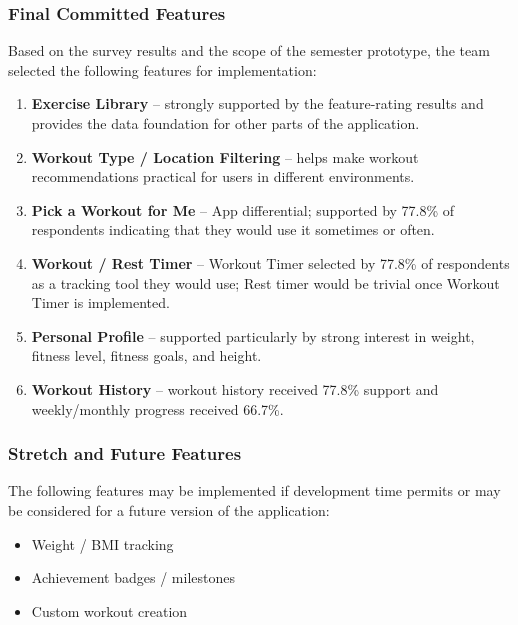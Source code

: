 \documentclass[11pt]{article}
\begin{document}

\subsubsection{Final Committed Features}

Based on the survey results and the scope of the semester prototype, the team selected the following features for implementation:

\begin{enumerate}
    \item \textbf{Exercise Library} -- strongly supported by the feature-rating results and provides the data foundation for other parts of the application.
    \item \textbf{Workout Type / Location Filtering} -- helps make workout recommendations practical for users in different environments.
    \item \textbf{Pick a Workout for Me} -- App differential; supported by 77.8\% of respondents indicating that they would use it sometimes or often.
    \item \textbf{Workout / Rest Timer} -- Workout Timer selected by 77.8\% of respondents as a tracking tool they would use; Rest timer would be trivial once Workout Timer is implemented.
    \item \textbf{Personal Profile} -- supported particularly by strong interest in weight, fitness level, fitness goals, and height.
    \item \textbf{Workout History} -- workout history received 77.8\% support and weekly/monthly progress received 66.7\%.
\end{enumerate}

\subsubsection{Stretch and Future Features}

The following features may be implemented if development time permits
or may be considered for a future version of the application:

\begin{itemize}
    \item Weight / BMI tracking
    \item Achievement badges / milestones
    \item Custom workout creation
\end{itemize}
\end{document}
